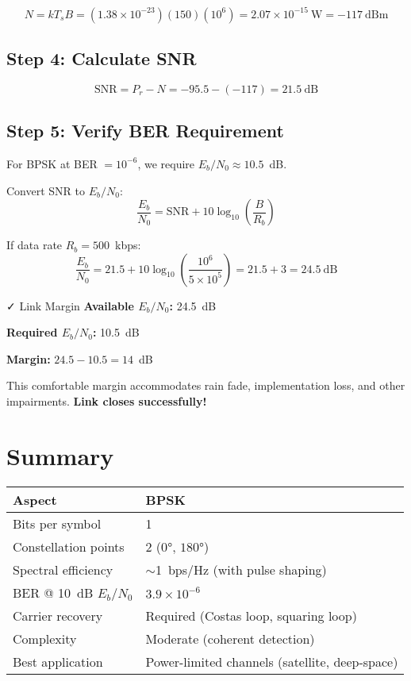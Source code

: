 \begin{equation}
N = kT_sB = (1.38 \times 10^{-23})(150)(10^6) = 2.07 \times 10^{-15}\ \text{W} = -117\ \text{dBm}
\end{equation}

\subsection{Step 4: Calculate SNR}

\begin{equation}
\mathrm{SNR} = P_r - N = -95.5 - (-117) = 21.5\ \text{dB}
\end{equation}

\subsection{Step 5: Verify BER Requirement}

For BPSK at BER $= 10^{-6}$, we require $E_b/N_0 \approx 10.5$~dB.

Convert SNR to $E_b/N_0$:
\begin{equation}
\frac{E_b}{N_0} = \mathrm{SNR} + 10\log_{10}\left(\frac{B}{R_b}\right)
\end{equation}

If data rate $R_b = 500$~kbps:
\begin{equation}
\frac{E_b}{N_0} = 21.5 + 10\log_{10}\left(\frac{10^6}{5 \times 10^5}\right) = 21.5 + 3 = 24.5\ \text{dB}
\end{equation}

\begin{calloutbox}[colback=green!5!white,colframe=green!75!black]{✓ Link Margin}
\textbf{Available $E_b/N_0$:} 24.5~dB

\textbf{Required $E_b/N_0$:} 10.5~dB

\textbf{Margin:} $24.5 - 10.5 = 14$~dB

This comfortable margin accommodates rain fade, implementation loss, and other impairments. \textbf{Link closes successfully!}
\end{calloutbox}

\section{Summary}

\begin{center}
\begin{tabular}{@{}ll@{}}
\toprule
\textbf{Aspect} & \textbf{BPSK} \\
\midrule
Bits per symbol & 1 \\
Constellation points & 2 ($0°$, $180°$) \\
Spectral efficiency & $\sim$1~bps/Hz (with pulse shaping) \\
BER @ 10~dB $E_b/N_0$ & $3.9 \times 10^{-6}$ \\
Carrier recovery & Required (Costas loop, squaring loop) \\
Complexity & Moderate (coherent detection) \\
Best application & Power-limited channels (satellite, deep-space) \\
\bottomrule
\end{tabular}
\end{center}

